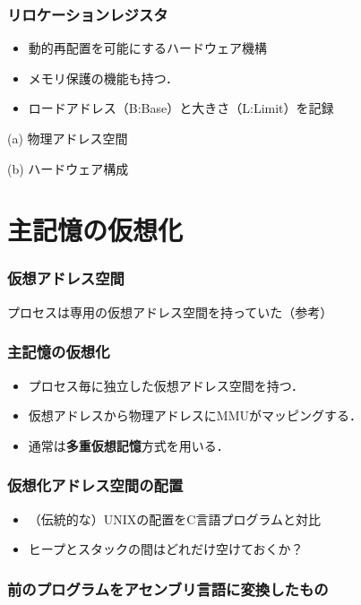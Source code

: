 \documentclass[unicode]{beamer}                   %
\begin{document}
\begin{frame}
  \frametitle{リロケーションレジスタ}
  \begin{itemize}
    \item 動的再配置を可能にするハードウェア機構
    \item メモリ保護の機能も持つ．
    \item ロードアドレス（B:Base）と大きさ（L:Limit）を記録
  \end{itemize}
  \begin{minipage}{0.49\columnwidth}
    \centerline{(a) 物理アドレス空間}
  \end{minipage}
  \begin{minipage}{0.49\columnwidth}
    \centerline{(b) ハードウェア構成}
  \end{minipage}
  \vfill
\end{frame}

\section{主記憶の仮想化}
\begin{frame}
  \frametitle{仮想アドレス空間}
  プロセスは専用の仮想アドレス空間を持っていた（参考）
\end{frame}
\begin{frame}
  \frametitle{主記憶の仮想化}
  \begin{itemize}
    \item プロセス毎に独立した仮想アドレス空間を持つ．
    \item 仮想アドレスから物理アドレスにMMUがマッピングする．
    \item 通常は{\bf 多重仮想記憶}方式を用いる．
  \end{itemize}
\end{frame}

\begin{frame}
  \frametitle{仮想化アドレス空間の配置}
  \begin{itemize}
    \item （伝統的な）UNIXの配置をC言語プログラムと対比
    \item ヒープとスタックの間はどれだけ空けておくか？
  \end{itemize}
\end{frame}

\begin{frame}
  \frametitle{前のプログラムをアセンブリ言語に変換したもの}
\end{frame}
\end{document}
